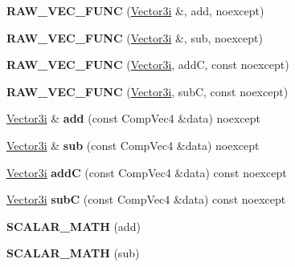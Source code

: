 \begin{DoxyCompactItemize}
{\bfseries R\+A\+W\+\_\+\+V\+E\+C\+\_\+\+F\+U\+NC} (\mbox{\hyperlink{class_vector3i}{Vector3i}} \&, add, noexcept)
\item 
\mbox{\label{class_vector3i_adcc0ccde8314adc90cc64be7e644b945}} 
{\bfseries R\+A\+W\+\_\+\+V\+E\+C\+\_\+\+F\+U\+NC} (\mbox{\hyperlink{class_vector3i}{Vector3i}} \&, sub, noexcept)
\item 
\mbox{\label{class_vector3i_a9bf35e7328821b4b6c0f6267950a93c9}} 
{\bfseries R\+A\+W\+\_\+\+V\+E\+C\+\_\+\+F\+U\+NC} (\mbox{\hyperlink{class_vector3i}{Vector3i}}, addC, const noexcept)
\item 
\mbox{\label{class_vector3i_a2f10fbb7f611c4d00bd67c3e90eccc67}} 
{\bfseries R\+A\+W\+\_\+\+V\+E\+C\+\_\+\+F\+U\+NC} (\mbox{\hyperlink{class_vector3i}{Vector3i}}, subC, const noexcept)
\item 
\mbox{\label{class_vector3i_ac1e19fcb1503bce883cee043e3fe8f90}} 
\mbox{\hyperlink{class_vector3i}{Vector3i}} \& {\bfseries add} (const Comp\+Vec4 \&data) noexcept
\item 
\mbox{\label{class_vector3i_a4f6bedb5bb92efe4316605dd2c74fecf}} 
\mbox{\hyperlink{class_vector3i}{Vector3i}} \& {\bfseries sub} (const Comp\+Vec4 \&data) noexcept
\item 
\mbox{\label{class_vector3i_a38f909bac193ef6a0c785ffa14f4f1a7}} 
\mbox{\hyperlink{class_vector3i}{Vector3i}} {\bfseries addC} (const Comp\+Vec4 \&data) const noexcept
\item 
\mbox{\label{class_vector3i_aac41b16dbfa52ae6ddee65fded928f75}} 
\mbox{\hyperlink{class_vector3i}{Vector3i}} {\bfseries subC} (const Comp\+Vec4 \&data) const noexcept
\item 
\mbox{\label{class_vector3i_ad889eaac86c6999b14a7bbcee34cdc60}} 
{\bfseries S\+C\+A\+L\+A\+R\+\_\+\+M\+A\+TH} (add)
\item 
\mbox{\label{class_vector3i_a6adb549a7775c301558ce550c05e2e3e}} 
{\bfseries S\+C\+A\+L\+A\+R\+\_\+\+M\+A\+TH} (sub)
\item 
\mbox{\label{class_vector3i_abac6187bb6be5aafb0c67c82d999a7f0}} 

\end{DoxyCompactItemize}
